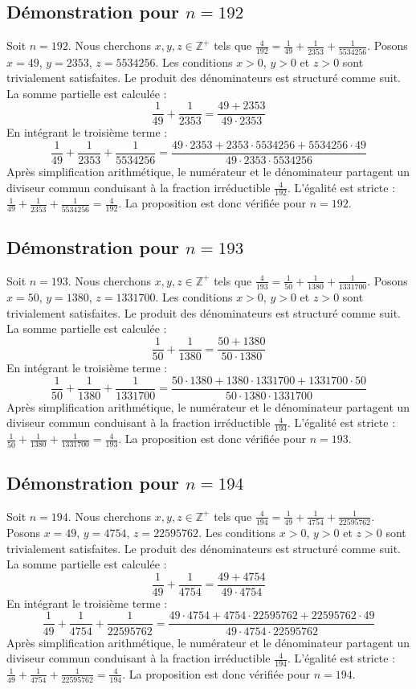 \documentclass[11pt,a4paper]{article}
\begin{document}
\subsection{Démonstration pour $n = 192$}
Soit $n = 192$. Nous cherchons $x, y, z \in \mathbb{Z}^{+}$ tels que $\frac{4}{192} = \frac{1}{49} + \frac{1}{2353} + \frac{1}{5534256}$.
Posons $x = 49$, $y = 2353$, $z = 5534256$.
Les conditions $x > 0$, $y > 0$ et $z > 0$ sont trivialement satisfaites.
Le produit des dénominateurs est structuré comme suit. La somme partielle est calculée :
$$ \frac{1}{49} + \frac{1}{2353} = \frac{49+2353}{49 \cdot 2353} $$
En intégrant le troisième terme :
$$ \frac{1}{49} + \frac{1}{2353} + \frac{1}{5534256} = \frac{49 \cdot 2353 + 2353 \cdot 5534256 + 5534256 \cdot 49}{49 \cdot 2353 \cdot 5534256} $$
Après simplification arithmétique, le numérateur et le dénominateur partagent un diviseur commun conduisant à la fraction irréductible $\frac{4}{192}$.
L'égalité est stricte : $\frac{1}{49} + \frac{1}{2353} + \frac{1}{5534256} = \frac{4}{192}$.
La proposition est donc vérifiée pour $n = 192$.
\subsection{Démonstration pour $n = 193$}
Soit $n = 193$. Nous cherchons $x, y, z \in \mathbb{Z}^{+}$ tels que $\frac{4}{193} = \frac{1}{50} + \frac{1}{1380} + \frac{1}{1331700}$.
Posons $x = 50$, $y = 1380$, $z = 1331700$.
Les conditions $x > 0$, $y > 0$ et $z > 0$ sont trivialement satisfaites.
Le produit des dénominateurs est structuré comme suit. La somme partielle est calculée :
$$ \frac{1}{50} + \frac{1}{1380} = \frac{50+1380}{50 \cdot 1380} $$
En intégrant le troisième terme :
$$ \frac{1}{50} + \frac{1}{1380} + \frac{1}{1331700} = \frac{50 \cdot 1380 + 1380 \cdot 1331700 + 1331700 \cdot 50}{50 \cdot 1380 \cdot 1331700} $$
Après simplification arithmétique, le numérateur et le dénominateur partagent un diviseur commun conduisant à la fraction irréductible $\frac{4}{193}$.
L'égalité est stricte : $\frac{1}{50} + \frac{1}{1380} + \frac{1}{1331700} = \frac{4}{193}$.
La proposition est donc vérifiée pour $n = 193$.
\subsection{Démonstration pour $n = 194$}
Soit $n = 194$. Nous cherchons $x, y, z \in \mathbb{Z}^{+}$ tels que $\frac{4}{194} = \frac{1}{49} + \frac{1}{4754} + \frac{1}{22595762}$.
Posons $x = 49$, $y = 4754$, $z = 22595762$.
Les conditions $x > 0$, $y > 0$ et $z > 0$ sont trivialement satisfaites.
Le produit des dénominateurs est structuré comme suit. La somme partielle est calculée :
$$ \frac{1}{49} + \frac{1}{4754} = \frac{49+4754}{49 \cdot 4754} $$
En intégrant le troisième terme :
$$ \frac{1}{49} + \frac{1}{4754} + \frac{1}{22595762} = \frac{49 \cdot 4754 + 4754 \cdot 22595762 + 22595762 \cdot 49}{49 \cdot 4754 \cdot 22595762} $$
Après simplification arithmétique, le numérateur et le dénominateur partagent un diviseur commun conduisant à la fraction irréductible $\frac{4}{194}$.
L'égalité est stricte : $\frac{1}{49} + \frac{1}{4754} + \frac{1}{22595762} = \frac{4}{194}$.
La proposition est donc vérifiée pour $n = 194$.
\end{document}
